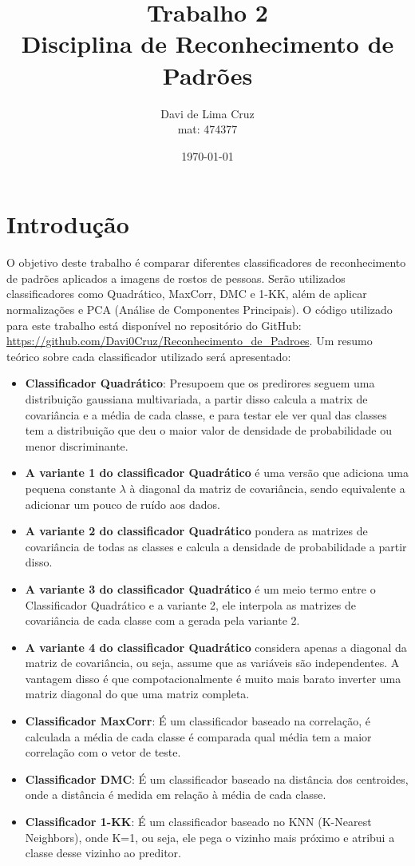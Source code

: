 \documentclass[a4paper,12pt]{article}
\title{Trabalho 2 \\ Disciplina de Reconhecimento de Padrões}
\author{Davi de Lima Cruz \\ mat: 474377}
\date{\today}
\newcommand{\nonumsection}[1]{%
  \section*{#1}%
  \addcontentsline{toc}{section}{#1}%
}
\begin{document}
\clearpage\maketitle
\thispagestyle{empty}
\nonumsection{Introdução}
O objetivo deste trabalho é comparar diferentes classificadores de reconhecimento de padrões aplicados a imagens de rostos de pessoas.
Serão utilizados classificadores como Quadrático, MaxCorr, DMC e 1-KK, além de aplicar normalizações e PCA (Análise de Componentes Principais).
O código utilizado para este trabalho está disponível no repositório do GitHub: \url{https://github.com/Davi0Cruz/Reconhecimento_de_Padroes}.
Um resumo teórico sobre cada classificador utilizado será apresentado:
\begin{itemize}
    \item \textbf{Classificador Quadrático}: Presupoem que os predirores seguem uma distribuição gaussiana multivariada,
    a partir disso calcula a matrix de covariância e a média de cada classe, e para testar ele ver qual das classes tem a
    distribuição que deu o maior valor de densidade de probabilidade ou menor discriminante.
    \item \textbf{A variante 1 do classificador Quadrático} é uma versão que adiciona uma pequena constante $\lambda$ à diagonal da matriz de covariância, sendo equivalente a adicionar um pouco de ruído aos dados.
    \item \textbf{A variante 2 do classificador Quadrático} pondera as matrizes de covariância de todas as classes e calcula a densidade de probabilidade
    a partir disso.
    \item \textbf{A variante 3 do classificador Quadrático} é um meio termo entre o Classificador Quadrático e a variante 2, ele interpola as matrizes de covariância
    de cada classe com a gerada pela variante 2.
    \item \textbf{A variante 4 do classificador Quadrático} considera apenas a diagonal da matriz de covariância, ou seja, assume que as variáveis são independentes.
     A vantagem disso é que compotacionalmente é muito mais barato inverter uma matriz diagonal do que uma matriz completa.
    \item \textbf{Classificador MaxCorr}: É um classificador baseado na correlação, é calculada a média de cada classe é comparada qual média tem a maior correlação com o vetor de teste.
    \item \textbf{Classificador DMC}: É um classificador baseado na distância dos centroides, onde a distância é medida em relação à média de cada classe.
    \item \textbf{Classificador 1-KK}: É um classificador baseado no KNN (K-Nearest Neighbors), onde K=1, ou seja, ele pega o vizinho mais próximo e atribui a classe desse vizinho ao preditor.
\end{itemize}
\end{document}
